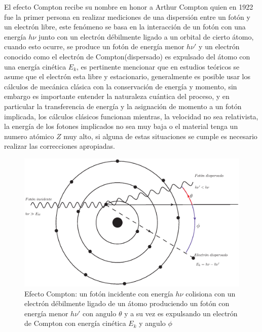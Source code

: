El efecto Compton recibe su nombre en honor a Arthur Compton quien en 1922 fue la primer persona en realizar mediciones de una dispersión entre un fotón y un electrón libre, este fenómeno se basa en la interacción de un fotón con una energía $h\nu$ junto con un electrón débilmente ligado a un orbital de cierto átomo, cuando esto ocurre, se produce un fotón de energía menor $h\nu '$ y un electrón conocido como el electrón de Compton(dispersado) es expulsado del átomo con una energía cinética $E_k$, es pertinente mencionar que en estudios teóricos se asume que el electrón esta libre y estacionario\cite{Podgorsak}, generalmente es posible usar los cálculos de mecánica clásica con la conservación de energía y momento, sin embargo es importante entender la naturaleza cuántica del proceso, y en particular la transferencia de energía y la asignación de momento a un fotón implicada, los cálculos clásicos funcionan mientras, la velocidad no sea relativista, la energía de los fotones implicados no sea muy baja o el material tenga un numero atómico $Z$ muy alto, si alguna de estas situaciones se cumple es necesario realizar las correcciones apropiadas\cite{Edward}.\\
\begin{figure}[htbp]
    \centering
    \includegraphics[width=.68\linewidth]{./Figures/compton1.eps}
    \caption[Efecto Compton]{Efecto Compton: un fotón incidente con energía $h\nu$ colisiona con un electrón débilmente ligado de un átomo produciendo un fotón con energía menor $h\nu '$ con angulo $\theta$ y a su vez es expulsando un electrón de Compton con energía cinética $E_k$ y angulo $\phi$}
    \label{fig:Compton}
\end{figure}

